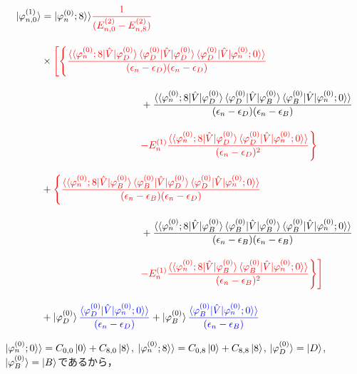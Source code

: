 \begin{align}
    \ket{\varphi_{n,0}^{(1)}}
    &=
    |\varphi^{(0)}_n;8\rangle\rangle
    \textcolor{red}{\frac{1}{(E^{(2)}_{n,0}-E^{(2)}_{n,8})}}\nn[10pt]
    &\times
    \textcolor{red}{\Biggl[\Biggl\{
    \frac{\langle\braket{\varphi^{(0)}_{n};8|\hat{V}|\varphi^{(0)}_D}
    \langle{\varphi^{(0)}_{D}|\hat{V}|\varphi^{(0)}_D}\rangle
    \braket{\varphi^{(0)}_{D}|\hat{V}|\varphi^{(0)}_n;0}\rangle}
    {(\epsilon_n-\epsilon_D)(\epsilon_n-\epsilon_D)}}\nn[10pt]
    &\hspace{100pt}
    +{\frac{\langle\braket{\varphi^{(0)}_{n};8|\hat{V}|\varphi^{(0)}_D}
    \langle{\varphi^{(0)}_{D}|\hat{V}|\varphi^{(0)}_B}\rangle
    \braket{\varphi^{(0)}_{B}|\hat{V}|\varphi^{(0)}_n;0}\rangle}
    {(\epsilon_n-\epsilon_D)(\epsilon_n-\epsilon_B)}}\nn[10pt]
    &\hspace{100pt}
    \textcolor{red}{-E^{(1)}_n
    \frac{\langle\braket{\varphi^{(0)}_{n};8|\hat{V}|\varphi^{(0)}_D}
    \braket{\varphi^{(0)}_{D}|\hat{V}|\varphi^{(0)}_n;0}\rangle}{(\epsilon_n-\epsilon_D)^2}
    \Biggr\}}
    \nn[10pt]
    &+\textcolor{red}{\Biggl\{
    \frac{\langle\braket{\varphi^{(0)}_{n};8|\hat{V}|\varphi^{(0)}_B}
    \langle{\varphi^{(0)}_{B}|\hat{V}|\varphi^{(0)}_D}\rangle
    \braket{\varphi^{(0)}_{D}|\hat{V}|\varphi^{(0)}_n;0}\rangle}
    {(\epsilon_n-\epsilon_B)(\epsilon_n-\epsilon_D)}}\nn[10pt]
    &\hspace{100pt}
    +{\frac{\langle\braket{\varphi^{(0)}_{n};8|\hat{V}|\varphi^{(0)}_B}
    \langle{\varphi^{(0)}_{B}|\hat{V}|\varphi^{(0)}_B}\rangle
    \braket{\varphi^{(0)}_{B}|\hat{V}|\varphi^{(0)}_n;0}\rangle}
    {(\epsilon_n-\epsilon_B)(\epsilon_n-\epsilon_B)}}\nn[10pt]
    &\hspace{100pt}
    \textcolor{red}{-E^{(1)}_n
    \frac{\langle\braket{\varphi^{(0)}_{n};8|\hat{V}|\varphi^{(0)}_B}
    \braket{\varphi^{(0)}_{B}|\hat{V}|\varphi^{(0)}_n;0}\rangle}{(\epsilon_n-\epsilon_B)^2}
    \Biggr\}\Biggr]}
    \nn[10pt]
    &+
    \ket{\varphi^{(0)}_D}
    \textcolor{blue}{
    \frac{\braket{\varphi^{(0)}_{D}|\hat{V}|\varphi^{(0)}_n;0}\rangle}{(\epsilon_n-\epsilon_D)}}
    +
    \ket{\varphi^{(0)}_B}
    \textcolor{blue}{
    \frac{\braket{\varphi^{(0)}_{B}|\hat{V}|\varphi^{(0)}_n;0}\rangle}{(\epsilon_n-\epsilon_B)}}
\end{align}

$|\varphi^{(0)}_{n};0\rangle\rangle=C_{0,0}\ket{0}+C_{8,0}\ket{8}$, 
$|\varphi^{(0)}_{n};8\rangle\rangle=C_{0,8}\ket{0}+C_{8,8}\ket{8}$,  $|\varphi^{(0)}_{D}\rangle=\ket{D}$, $|\varphi^{(0)}_{B}\rangle=\ket{B}$であるから，


